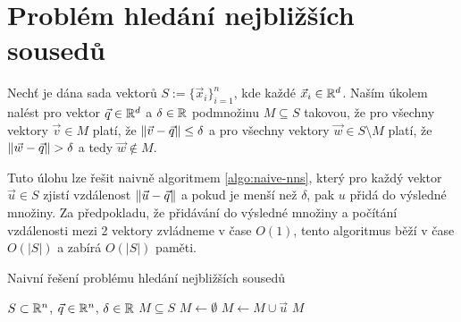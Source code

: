 

\section{Problém hledání nejbližších sousedů}

\label{defi:nns}
\begin{defi}
  Nechť je dána sada vektorů $S := \{\vec{x}_i\}_{i = 1}^n$, kde každé $\vec{x}_i \in \mathbb{R}^d$. Naším úkolem nalést pro vektor $\vec{q} \in \mathbb{R}^d$ a $\delta \in \mathbb{R}$ podmnožinu $M \subseteq S$ takovou, že pro všechny vektory $\vec{v} \in M$ platí, že $\|\vec{v} - \vec{q}\| \leq \delta$ a pro všechny vektory $\vec{w} \in S \setminus M$ platí, že $\|\vec{w} - \vec{q}\| > \delta$ a tedy $\vec{w} \not\in M$.
\end{defi}

Tuto úlohu lze řešit naivně algoritmem \ref{algo:naive-nns}, který pro každý vektor $\vec{u} \in S$ zjistí vzdálenost $\|\vec{u} - \vec{q}\|$ a pokud je menší než $\delta$, pak $u$ přidá do výsledné množiny. Za předpokladu, že přidávání do výsledné množiny a počítání vzdálenosti mezi 2 vektory zvládneme v čase $O(1)$, tento algoritmus běží v čase $O(|S|)$ a zabírá $O(|S|)$ paměti.

\begin{algorithm}[ht!]
  \caption{Naivní řešení problému hledání nejbližších sousedů}
  \label{algo:naive-nns}
  \begin{algorithmic}
    \REQUIRE $S \subset \mathbb{R}^n$, $\vec{q} \in \mathbb{R}^n$, $\delta \in \mathbb{R}$
    \ENSURE $M \subseteq S$
    \STATE $M \leftarrow \emptyset$
          \STATE $M \leftarrow M \cup \vec{u}$
        \ENDIF
    \ENDFOR
    \RETURN $M$
  \end{algorithmic}
\end{algorithm}

